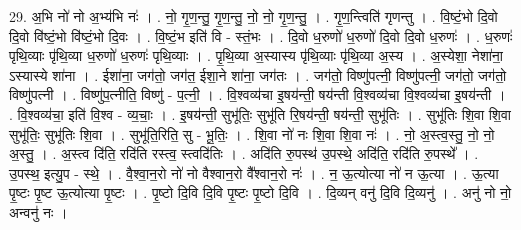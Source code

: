 \documentclass[17pt]{extarticle}
\begin{document}
29. अ॒भि नो॑ नो अ॒भ्य॑भि नः॑ । . नो॒ गृ॒ण॒न्तु॒ गृ॒ण॒न्तु॒ नो॒ नो॒ गृ॒ण॒न्तु॒ । . गृ॒ण॒न्त्विति॑ गृणन्तु । . वि॒ष्टं॒भो दि॒वो दि॒वो वि॑ष्टं॒भो वि॑ष्टं॒भो दि॒वः । . वि॒ष्टं॒भ इति॑ वि - स्तं॒भः । . दि॒वो ध॒रुणो॑ ध॒रुणो॑ दि॒वो दि॒वो ध॒रुणः॑ । . ध॒रुणः॑ पृथि॒व्याः पृ॑थि॒व्या ध॒रुणो॑ ध॒रुणः॑ पृथि॒व्याः । . पृ॒थि॒व्या अ॒स्यास्य पृ॑थि॒व्याः पृ॑थि॒व्या अ॒स्य । . अ॒स्येशा॒ नेशा॑ना॒ ऽस्यास्ये शा॑ना । . ईशा॑ना॒ जग॑तो॒ जग॑त॒ ईशा॒ने शा॑ना॒ जग॑तः । . जग॑तो॒ विष्णु॑पत्नी॒ विष्णु॑पत्नी॒ जग॑तो॒ जग॑तो॒ विष्णु॑पत्नी । . विष्णु॑प॒त्नीति॒ विष्णु॑ - प॒त्नी॒ । . वि॒श्वव्य॑चा इ॒षय॑न्ती॒ षय॑न्ती वि॒श्वव्य॑चा वि॒श्वव्य॑चा इ॒षय॑न्ती । . वि॒श्वव्य॑चा॒ इति॑ वि॒श्व - व्य॒चाः॒ । . इ॒षय॑न्ती॒ सुभू॑तिः॒ सुभू॑ति रि॒षय॑न्ती॒ षय॑न्ती॒ सुभू॑तिः । . सुभू॑तिः शि॒वा शि॒वा सुभू॑तिः॒ सुभू॑तिः शि॒वा । . सुभू॑ति॒रिति॒ सु - भू॒तिः॒ । . शि॒वा नो॑ नः शि॒वा शि॒वा नः॑ । . नो॒ अ॒स्त्व॒स्तु॒ नो॒ नो॒ अ॒स्तु॒ । . अ॒स्त्व दि॑ति॒ रदि॑ति रस्त्व॒ स्त्वदि॑तिः । . अदि॑ति रु॒पस्थ॑ उ॒पस्थे॒ अदि॑ति॒ रदि॑ति रु॒पस्थे᳚ । . उ॒पस्थ॒ इत्यु॒प - स्थे॒ । . वै॒श्वा॒न॒रो नो॑ नो वैश्वान॒रो वै᳚श्वान॒रो नः॑ । . न॒ ऊ॒त्योत्या नो॑ न ऊ॒त्या । . ऊ॒त्या पृ॒ष्टः पृ॒ष्ट ऊ॒त्योत्या पृ॒ष्टः । . पृ॒ष्टो दि॒वि दि॒वि पृ॒ष्टः पृ॒ष्टो दि॒वि । . दि॒व्यन् वनु॑ दि॒वि दि॒व्यनु॑ । . अनु॑ नो नो॒ अन्वनु॑ नः । \newline
\end{document}
